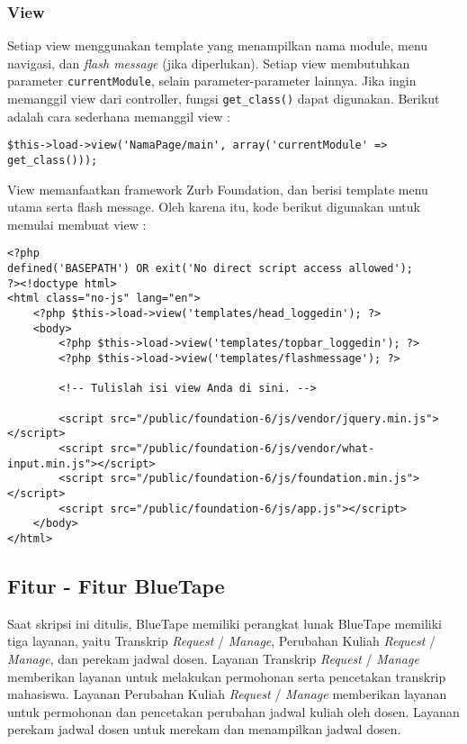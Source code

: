 \subsubsection{View}
Setiap view menggunakan template yang menampilkan nama module, menu navigasi, dan \textit{flash message} (jika diperlukan). Setiap view membutuhkan parameter \texttt{currentModule}, selain parameter-parameter lainnya. Jika ingin memanggil view dari controller, fungsi \texttt{get\_class()} dapat digunakan. Berikut adalah cara sederhana memanggil view :  
\begin{lstlisting}
$this->load->view('NamaPage/main', array('currentModule' => get_class()));
\end{lstlisting}

View memanfaatkan framework Zurb Foundation, dan berisi template menu utama serta flash message. Oleh karena itu, kode berikut digunakan untuk memulai membuat view :
\begin{lstlisting}
<?php
defined('BASEPATH') OR exit('No direct script access allowed');
?><!doctype html>
<html class="no-js" lang="en">
    <?php $this->load->view('templates/head_loggedin'); ?>
    <body>
        <?php $this->load->view('templates/topbar_loggedin'); ?>
        <?php $this->load->view('templates/flashmessage'); ?>

        <!-- Tulislah isi view Anda di sini. -->

        <script src="/public/foundation-6/js/vendor/jquery.min.js"></script>
        <script src="/public/foundation-6/js/vendor/what-input.min.js"></script>
        <script src="/public/foundation-6/js/foundation.min.js"></script>
        <script src="/public/foundation-6/js/app.js"></script>
    </body>
</html>
\end{lstlisting}

\subsection{Fitur - Fitur BlueTape}
Saat skripsi ini ditulis, BlueTape memiliki perangkat lunak BlueTape memiliki tiga layanan, yaitu Transkrip \textit{Request} / \textit{Manage}, Perubahan Kuliah \textit{Request} / \textit{Manage}, dan perekam jadwal dosen. Layanan Transkrip \textit{Request} / \textit{Manage} memberikan layanan untuk melakukan permohonan serta pencetakan transkrip mahasiswa. Layanan Perubahan Kuliah \textit{Request} / \textit{Manage} memberikan layanan untuk permohonan dan pencetakan perubahan jadwal kuliah oleh dosen. Layanan perekam jadwal dosen untuk merekam dan menampilkan jadwal dosen.

